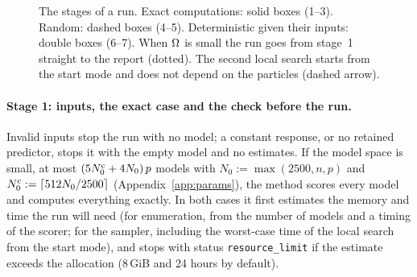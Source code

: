 \begin{figure}[ht]
\centering
{}
\caption{The stages of a run. Exact computations: solid boxes (1--3). Random: dashed boxes (4--5). Deterministic given
their inputs: double boxes (6--7). When $\Omega$ is small the run goes from stage~1 straight to the report (dotted). The
second local search starts from the start mode and does not depend on the particles (dashed arrow).}
\label{fig:pipeline}
\end{figure}

\paragraph{Stage 1: inputs, the exact case and the check before the run.} Invalid inputs stop the run with no model; a constant response, or no retained predictor, stops it with the empty
model and no estimates. If the model space is small, at most $(5N^{\mathrm c}_0+4N_0)\,p$ models with $N_0:=\max(2500,n,p)$ and
$N^{\mathrm c}_0:=\lceil512N_0/2500\rceil$ (Appendix~\ref{app:params}), the method scores every model and computes everything
exactly. In both cases it first estimates the memory and time the run will need (for enumeration, from the number of
models and a timing of the scorer; for the sampler, including the worst-case time of the local search from the start
mode), and stops with status \texttt{resource\_limit} if the estimate exceeds the allocation (8\,GiB and 24 hours by
default).

